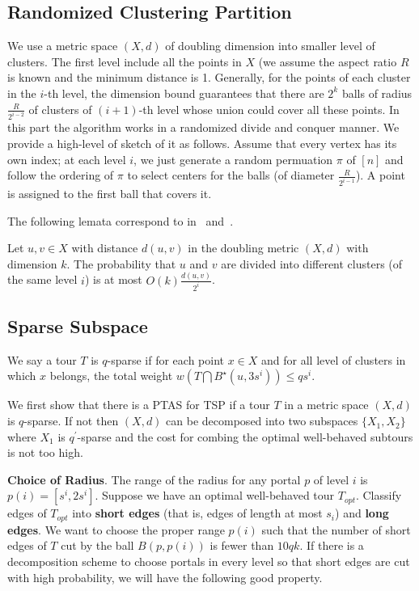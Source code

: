 \documentclass{llncs}
\begin{document}
\subsection{Randomized Clustering Partition}
We use a metric space $(X,d)$ of doubling dimension into smaller level of clusters.
The first level include all the points in $X$ (we assume the aspect ratio $R$ is known and the minimum distance is 1.
Generally, for the points of each cluster in the $i$-th level, the dimension bound guarantees that there are $2^k$ balls of radius $\frac{R}{2^{i-2}}$ of clusters of $(i+1)$-th level whose union could cover all these points.
In this part the algorithm works in a randomized divide and conquer manner.
We provide a high-level of sketch of it as follows.
Assume that every vertex has its own index; at each level $i$, we just generate a random permuation $\pi$ of $[n]$ and follow the ordering of $\pi$ to select centers for the balls (of diameter $\frac{R}{2^{i-1}}$).
A point is assigned to the first ball that covers it.

The following lemata correspond to in~\cite{Talwar04} and~\cite{Bartal12}. 

\begin{lemma}
Let $u,v\in X$ with distance $d(u,v)$ in the doubling metric $(X,d)$ with dimension $k$. 
The probability that $u$ and $v$ are divided into different clusters (of the same level $i$) is at most $O(k)\frac{d(u,v)}{2^i}$.
\end{lemma}

\subsection{Sparse Subspace}
\begin{definition}[Sparsity]
We say a tour $T$ is $q$-sparse if for each point $x\in X$ and for all level of clusters in which $x$ belongs, the total weight $w(T\bigcap B^\star(u,3s^i))\leq q s^i$. 
\end{definition}



We first show that there is a PTAS for TSP if a tour $T$ in a metric space $(X,d)$ is $q$-sparse. 
If not then $(X,d)$ can be decomposed into two subspaces $\{X_1, X_2\}$ where $X_1$ is $q^\prime$-sparse and the cost for combing the optimal well-behaved subtours is not too high.

\textbf{Choice of Radius}. The range of the radius for any portal $p$ of level $i$ is $p(i)=[s^i, 2s^i]$.
Suppose we have an optimal well-behaved tour $T_{opt}$.
Classify edges of $T_{opt}$ into \textbf{short edges} (that is, edges of length at most $s_i$) and \textbf{long edges}.
We want to choose the proper range $p(i)$ such that the number of short edges of $T$ cut by the ball $B(p, p(i))$ is fewer than $10qk$.
If there is a decomposition scheme to choose portals in every level so that short edges are cut with high probability, we will have the following good property.
\end{document}
